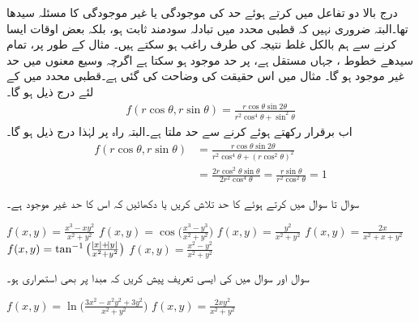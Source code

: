 درج بالا دو تفاعل میں  کرتے ہوئے  حد کی موجودگی یا غیر موجودگی کا مسئلہ سیدھا تھا۔البتہ ضروری نہیں کہ  قطبی محدد میں تبادلہ سودمند ثابت ہو، بلکہ بعض اوقات ایسا کرنے سے ہم بالکل غلط نتیجہ کی طرف راغب ہو سکتے ہیں۔ مثال کے طور پر، تمام سیدھے خطوط ، جہاں  مستقل ہے، پر حد موجود ہو سکتا ہے اگرچہ وسیع معنوں میں حد غیر موجود ہو گا۔ مثال  میں اس حقیقت کی وضاحت کی گئی ہے۔قطبی محدد میں  کے لئے   درج ذیل ہو گا۔
\begin{align*}
f(r\cos\theta,r\sin\theta)=\frac{r\cos\theta\sin2\theta}{r^2\cos^4\theta+\sin^2\theta}
\end{align*}
اب   برقرار رکھتے ہوئے   کرنے سے حد  ملتا ہے۔البتہ راہ  پر لہٰذا درج ذیل ہو گا۔
\begin{align*}
f(r\cos\theta,r\sin\theta)&=\frac{r\cos\theta\sin 2\theta}{r^2\cos^4\theta+(r\cos^2\theta)^2}\\
&=\frac{2r\cos^2\theta\sin\theta}{2r^2\cos^4\theta}=\frac{r\sin\theta}{r^2\cos^2\theta}=1
\end{align*}

سوال  تا سوال  میں  کرتے ہوئے  کا حد تلاش کریں یا دکھائیں کہ اس کا حد غیر موجود ہے۔

$f(x,y)=\frac{x^3-xy^2}{x^2+y^2}$
$f(x,y)=\cos\big(\frac{x^3-y^3}{x^2+y^2}\big)$
$f(x,y)=\frac{y^2}{x^2+y^2}$
$f(x,y)=\frac{2x}{x^2+x+y^2}$
$f(x,y)=\tan^{-1}\big(\frac{\abs{x}+\abs{y}}{x^2+y^2}\big)$
$f(x,y)=\frac{x^2-y^2}{x^2+y^2}$

سوال  اور سوال  میں  کی ایسی تعریف پیش کریں کہ  مبدا پر بھی استمراری ہو۔

$f(x,y)=\ln\big(\frac{3x^2-x^2y^2+3y^2}{x^2+y^2}\big)$
$f(x,y)=\frac{2xy^2}{x^2+y^2}$

